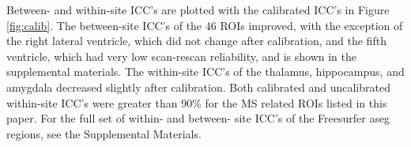 Between- and within-site ICC's are plotted with the calibrated ICC's in Figure \ref{fig:calib}. The between-site ICC's of the 46 ROIs improved, with the exception of the right lateral ventricle, which did not change after calibration, and the fifth ventricle, which  had very low scan-rescan reliability, and is shown in the supplemental materials. The within-site ICC's of the thalamus, hippocampus, and amygdala decreased slightly after calibration. Both calibrated and uncalibrated within-site ICC's were greater than 90\% for the MS related ROIs listed in this paper. For the full set of within- and between- site ICC's of the Freesurfer aseg regions, see the Supplemental Materials.
